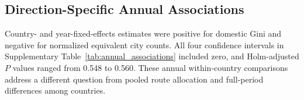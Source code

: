 \subsection{Direction-Specific Annual Associations}
\label{supp:association_results}

Country- and year-fixed-effects estimates were positive for domestic Gini and negative for normalized equivalent city counts. All four confidence intervals in Supplementary Table~\ref{tab:annual_associations} included zero, and Holm-adjusted $P$ values ranged from 0.548 to 0.560. These annual within-country comparisons address a different question from pooled route allocation and full-period differences among countries.

\endgroup
